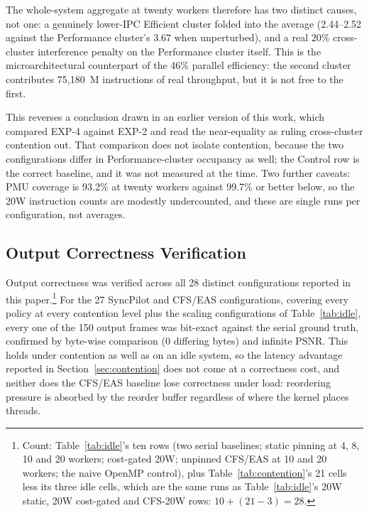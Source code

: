 \documentclass[conference]{IEEEtran}
\begin{document}
The whole-system aggregate at twenty workers therefore has two distinct causes, not one: a genuinely lower-IPC Efficient cluster folded into the average (2.44--2.52 against the Performance cluster's 3.67 when unperturbed), and a real 20\% cross-cluster interference penalty on the Performance cluster itself. This is the microarchitectural counterpart of the 46\% parallel efficiency: the second cluster contributes 75,180~M instructions of real throughput, but it is not free to the first.

This reverses a conclusion drawn in an earlier version of this work, which compared EXP-4 against EXP-2 and read the near-equality as ruling cross-cluster contention out. That comparison does not isolate contention, because the two configurations differ in Performance-cluster occupancy as well; the Control row is the correct baseline, and it was not measured at the time. Two further caveats: PMU coverage is 93.2\% at twenty workers against 99.7\% or better below, so the 20W instruction counts are modestly undercounted, and these are single runs per configuration, not averages.

\subsection{Output Correctness Verification}
\label{sec:correctness}
Output correctness was verified across all 28 distinct configurations reported in this paper.\footnote{Count: Table~\ref{tab:idle}'s ten rows (two serial baselines; static pinning at 4, 8, 10 and 20 workers; cost-gated 20W; unpinned CFS/EAS at 10 and 20 workers; the naive OpenMP control), plus Table~\ref{tab:contention}'s 21 cells less its three idle cells, which are the same runs as Table~\ref{tab:idle}'s 20W static, 20W cost-gated and CFS-20W rows: $10 + (21 - 3) = 28$.} For the 27 SyncPilot and CFS/EAS configurations, covering every policy at every contention level plus the scaling configurations of Table~\ref{tab:idle}, every one of the 150 output frames was bit-exact against the serial ground truth, confirmed by byte-wise comparison (0 differing bytes) and infinite PSNR. This holds under contention as well as on an idle system, so the latency advantage reported in Section~\ref{sec:contention} does not come at a correctness cost, and neither does the CFS/EAS baseline lose correctness under load: reordering pressure is absorbed by the reorder buffer regardless of where the kernel places threads.
\end{document}
